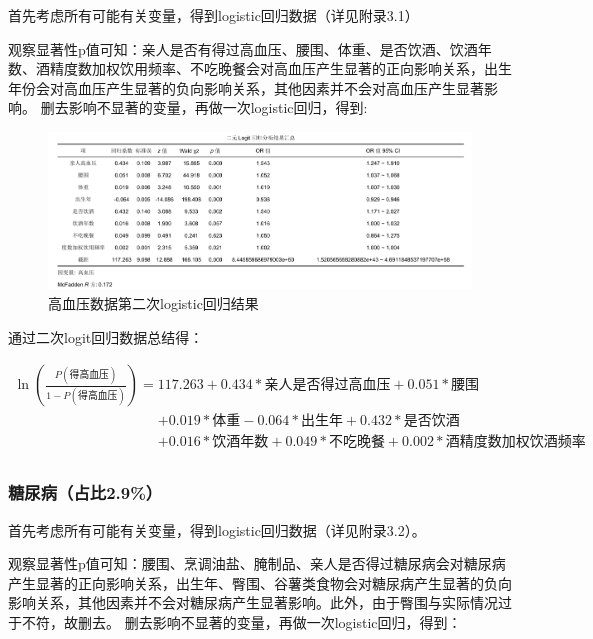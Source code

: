 \documentclass{article}
\numberwithin{equation}{subsection}
\begin{document}
首先考虑所有可能有关变量，得到logistic回归数据（详见附录3.1）

观察显著性p值可知：亲人是否有得过高血压、腰围、体重、是否饮酒、饮酒年数、酒精度数加权饮用频率、不吃晚餐会对高血压产生显著的正向影响关系，出生年份会对高血压产生显著的负向影响关系，其他因素并不会对高血压产生显著影响。
删去影响不显著的变量，再做一次logistic回归，得到:

\begin{figure}[H]
    \centering
    \includegraphics[scale=0.78]{logit2.png}
    \caption{高血压数据第二次logistic回归结果}
\end{figure}

通过二次logit回归数据总结得：

\begin{equation*}
    \begin{aligned}
        \ln(\frac{P(\text{得高血压})}{1-P(\text{得高血压})})
        =&117.263 + 0.434*\text{亲人是否得过高血压} + 0.051*\text{腰围}\\
        & + 0.019*\text{体重}-0.064*\text{出生年} + 0.432*\text{是否饮酒} \\
        &+ 0.016*\text{饮酒年数} + 0.049*\text{不吃晚餐} + 0.002*\text{酒精度数加权饮酒频率}\\
    \end{aligned}
\end{equation*}

\subsubsection{糖尿病（占比2.9\%）}

首先考虑所有可能有关变量，得到logistic回归数据（详见附录3.2）。

观察显著性p值可知：腰围、烹调油盐、腌制品、亲人是否得过糖尿病会对糖尿病产生显著的正向影响关系，出生年、臀围、谷薯类食物会对糖尿病产生显著的负向影响关系，其他因素并不会对糖尿病产生显著影响。此外，由于臀围与实际情况过于不符，故删去。
删去影响不显著的变量，再做一次logistic回归，得到：
\end{document}
